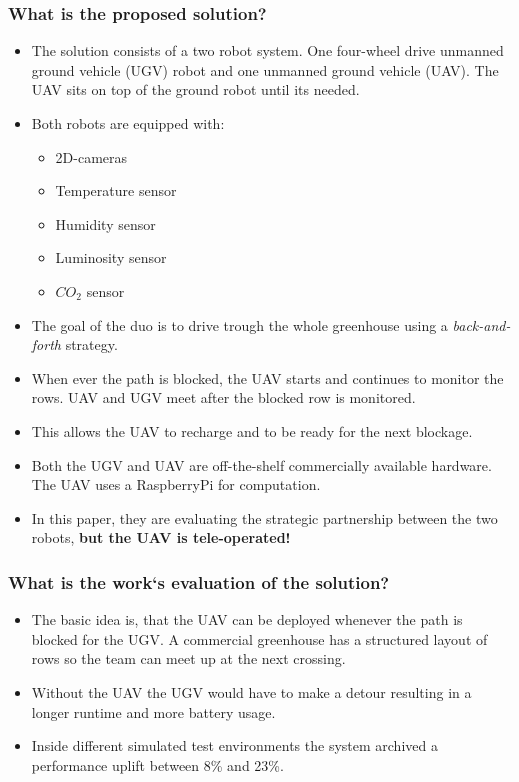         \subsubsection*{What is the proposed solution?}
    \begin{itemize}
        \item The solution consists of a two robot system. One four-wheel drive unmanned ground vehicle (UGV) robot and one unmanned ground vehicle (UAV). The UAV sits on top of the ground robot until its needed.
        \item Both robots are equipped with: \begin{itemize}
            \item 2D-cameras
            \item Temperature sensor
            \item Humidity sensor
            \item Luminosity sensor
            \item $CO_2$ sensor
        \end{itemize}
        \item The goal of the duo is to drive trough the whole greenhouse using a \emph{back-and-forth} strategy.
        \item When ever the path is blocked, the UAV starts and continues to monitor the rows. UAV and UGV meet after the blocked row is monitored. 
        \item This allows the UAV to recharge and to be ready for the next blockage.
        \item Both the UGV and UAV are off-the-shelf commercially available hardware. The UAV uses a RaspberryPi for computation.
        \item In this paper, they are evaluating the strategic partnership between the two robots, \textbf{but the UAV is tele-operated!}
    \end{itemize}
    \subsubsection*{What is the work`s evaluation of the solution?}
    \begin{itemize}
        \item The basic idea is, that the UAV can be deployed whenever the path is blocked for the UGV. A commercial greenhouse has a structured layout of rows so the team can meet up at the next crossing.
        \item Without the UAV the UGV would have to make a detour resulting in a longer runtime and more battery usage.
        \item Inside different simulated test environments the system archived a performance uplift between 8\% and 23\%.
    \end{itemize}
